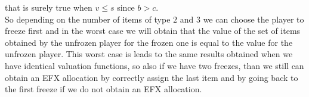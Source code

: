 \documentclass{article}
\begin{document}
that is surely true when $v\le s$ since $b> c$.\\
So depending on the number of items of type $2$ and $3$ we can choose the player to freeze first and in the worst case we will obtain that the value of the set of items obtained by the unfrozen player for the frozen one is equal to the value for the unfrozen player. This worst case is leads to the same results obtained when we have identical valuation functions, so also if we have two freezes, than we still can obtain an EFX allocation by correctly assign the last item and by going back to the first freeze if we do not obtain an EFX allocation.

\printbibliography %
\end{document}
